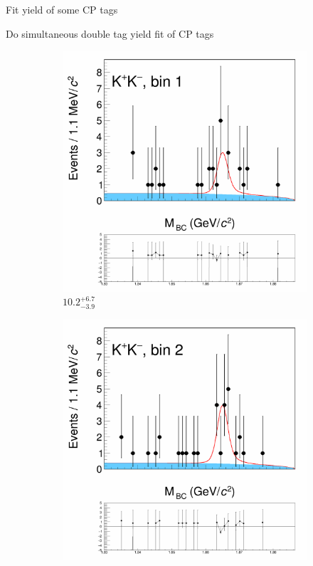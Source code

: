 \documentclass{beamer}
\begin{document}
\begin{frame}{Fit yield of some CP tags}
  \begin{center}
    Do simultaneous double tag yield fit of CP tags
  \end{center}
  \begin{figure}
    \centering
    \begin{subfigure}{0.49\textwidth}
      \includegraphics[width = 1.0\textwidth, trim = {0 14cm 0 0}, clip = true]{Plots/DoubleTagYield_DoubleTag_CP_KKpipi_vs_KK_SignalBin1.png}
      \caption{$10.2^{+6.7}_{-3.9}$}
    \end{subfigure}%
    \begin{subfigure}{0.49\textwidth}
      \includegraphics[width = 1.0\textwidth, trim = {0 14cm 0 0}, clip = true]{Plots/DoubleTagYield_DoubleTag_CP_KKpipi_vs_KK_SignalBin2.png}

\end{subfigure}
\end{figure}
\end{frame}
\end{document}
